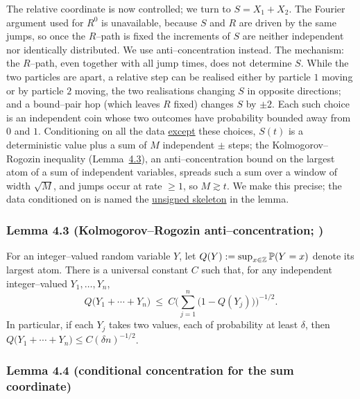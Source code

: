 \documentclass[11pt]{article}
\theoremstyle{plain}
\theoremstyle{definition}
\theoremstyle{remark}
\newcommand{\Z}{\mathbb{Z}}\newcommand{\R}{\mathbb{R}}\newcommand{\N}{\mathbb{N}}
\begin{document}
The relative coordinate is now controlled; we turn to $S=X_1+X_2$. The Fourier argument
used for $R^0$ is unavailable, because $S$ and $R$ are driven by the same jumps, so once
the $R$--path is fixed the increments of $S$ are neither independent nor identically
distributed. We use anti--concentration instead. The mechanism: the $R$--path, even
together with all jump times, does not determine $S$. While the two particles are apart,
a relative step can be realised either by particle $1$ moving or by particle $2$ moving,
the two realisations changing $S$ in opposite directions; and a bound--pair hop (which
leaves $R$ fixed) changes $S$ by $\pm2$. Each such choice is an independent coin whose
two outcomes have probability bounded away from $0$ and $1$. Conditioning on all the data
\underline{except} these choices, $S(t)$ is a deterministic value plus a sum of $M$
independent $\pm$ steps; the Kolmogorov--Rogozin inequality (Lemma~\hyperref[lem_KR]{4.3}), an
anti--concentration bound on the largest atom of a sum of independent variables, spreads
such a sum over a window of width $\sqrt M$, and jumps occur at rate $\ge1$, so
$M\gtrsim t$. We make this precise; the data conditioned on is named the \underline{unsigned
skeleton} in the lemma.

\subsubsection{Lemma 4.3 (Kolmogorov--Rogozin anti--concentration; {\cite[Ch.~III]{Petrov}})}\label{lem_KR}

For an integer--valued random variable $Y$, let $Q(Y):=\sup_{x\in\Z}\PP(Y=x)$ denote
its largest atom. There is a universal constant $C$ such that, for any independent
integer--valued $Y_1,\dots,Y_n$,
\[
  Q\big(Y_1+\cdots+Y_n\big)\ \le\
  C\Big(\textstyle\sum_{j=1}^n\big(1-Q(Y_j)\big)\Big)^{-1/2}.
\]
In particular, if each $Y_j$ takes two values, each of probability at least $\delta$,
then $Q\big(Y_1+\cdots+Y_n\big)\le C(\delta n)^{-1/2}$.
\par

\subsubsection{Lemma 4.4 (conditional concentration for the sum coordinate)}\label{lem_Slclt}
\end{document}
